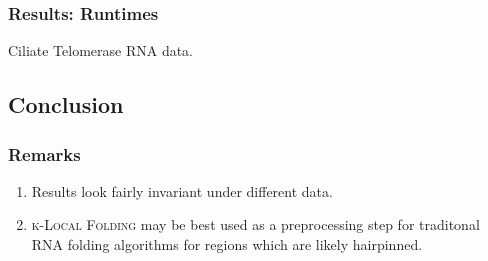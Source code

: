 \documentclass{beamer}
\newcommand{\klf}{\textsc{k-Local Folding} }
\begin{document}
\begin{frame}
\frametitle{Results: Runtimes}
Ciliate Telomerase RNA data.
\begin{figure}
\end{figure}
\end{frame}


\begin{frame}
\section{Conclusion}
\frametitle{Remarks}
\begin{enumerate}
\item Results look fairly invariant under different data. 
\item \klf may be best used as a preprocessing step for traditonal  RNA folding algorithms for regions which are likely hairpinned. 
\end{enumerate}
\end{frame}
\end{document}
